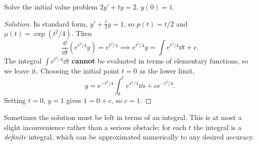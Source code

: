 \begin{eg}
	Solve the initial value problem \(2y' + ty = 2\), \(y(0) = 1\).
\end{eg}

\begin{proof}[Solution]
	In standard form, \(y' + \frac{t}{2}y = 1\), so \(p(t) = t/2\) and
	\(\mu(t) = \exp(t^2/4)\). Then
	\[
		\frac{\dd}{\dd t}\left( e^{t^2/4} y \right) = e^{t^2/4}
		\implies e^{t^2/4} y = \int e^{t^2/4} \dd t + c.
	\]
	The integral \(\int e^{t^2/4}\dd t\) \textbf{cannot} be evaluated in terms of
	elementary functions, so we leave it. Choosing the initial point \(t = 0\) as the
	lower limit,
	\[
		y = e^{-t^2/4}\int_{0}^{t} e^{s^2/4}\dd s + c e^{-t^2/4}.
	\]
	Setting \(t = 0\), \(y = 1\) gives \(1 = 0 + c\), so \(c = 1\).
\end{proof}

\begin{moral}
	Sometimes the solution must be left in terms of an integral. This is at most a slight
	inconvenience rather than a serious obstacle: for each \(t\) the integral is a
	\emph{definite} integral, which can be approximated numerically to any desired
	accuracy.
\end{moral}
